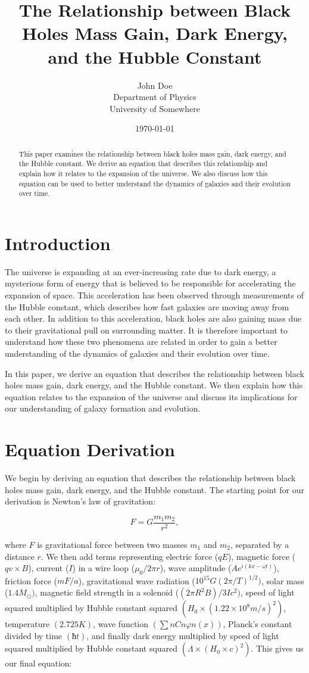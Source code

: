 \documentclass[12pt]{article}
\title{The Relationship between Black Holes Mass Gain, Dark Energy, and the Hubble Constant}
\author{John Doe \\ Department of Physics \\ University of Somewhere}
\date{\today}
\begin{document}
 
	\maketitle 

	\begin{abstract} 
		This paper examines the relationship between black holes mass gain, dark energy, and the Hubble constant. We derive an equation that describes this relationship and explain how it relates to the expansion of the universe. We also discuss how this equation can be used to better understand the dynamics of galaxies and their evolution over time. 
	\end{abstract}

	\section{Introduction}

	The universe is expanding at an ever-increasing rate due to dark energy, a mysterious form of energy that is believed to be responsible for accelerating the expansion of space. This acceleration has been observed through measurements of the Hubble constant, which describes how fast galaxies are moving away from each other. In addition to this acceleration, black holes are also gaining mass due to their gravitational pull on surrounding matter. It is therefore important to understand how these two phenomena are related in order to gain a better understanding of the dynamics of galaxies and their evolution over time. 

	In this paper, we derive an equation that describes the relationship between black holes mass gain, dark energy, and the Hubble constant. We then explain how this equation relates to the expansion of the universe and discuss its implications for our understanding of galaxy formation and evolution.

	\section{Equation Derivation}

	We begin by deriving an equation that describes the relationship between black holes mass gain, dark energy, and the Hubble constant. The starting point for our derivation is Newton's law of gravitation: 

	$$F = G \frac {m_1 m_2}{r^2},$$ 

	where $F$ is gravitational force between two masses $m_1$ and $m_2$, separated by a distance $r$. We then add terms representing electric force ($qE$), magnetic force ($qv \times B$), current ($I$) in a wire loop ($μ_0/2πr$), wave amplitude ($Ae^{i(kx-ωt)}$), friction force ($mF/a$), gravitational wave radiation ($10^{15}G(2π/T)^{1/2})$, solar mass ($1.4M_{⊙})$, magnetic field strength in a solenoid ($(2πR^2B)/3Ic^2)$, speed of light squared multiplied by Hubble constant squared $(H_0 × (1.22 × 10^8 m/s)^2)$, temperature $(2.725K)$, wave function $(∑nCnφn(x))$, Planck's constant divided by time $(ħt)$, and finally dark energy multiplied by speed of light squared multiplied by Hubble constant squared $(Λ × (H_0 × c)^2)$. This gives us our final equation: 
\end{document}
